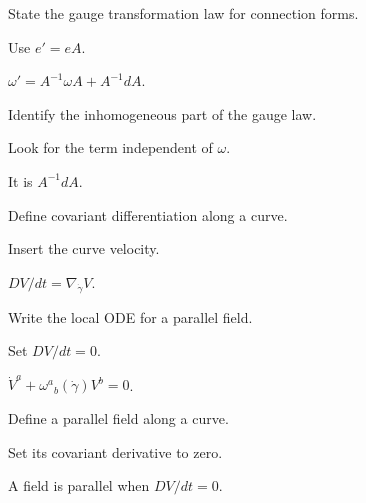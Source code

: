 \begin{exercise}\label{exr:vii21-09}
State the gauge transformation law for connection forms.
\end{exercise}
\begin{hint}
Use \(e'=eA\).
\end{hint}
\begin{solution}
\(\omega'=A^{-1}\omega A+A^{-1}dA\).
\end{solution}

\begin{exercise}\label{exr:vii21-10}
Identify the inhomogeneous part of the gauge law.
\end{exercise}
\begin{hint}
Look for the term independent of \(\omega\).
\end{hint}
\begin{solution}
It is \(A^{-1}dA\).
\end{solution}

\begin{exercise}\label{exr:vii21-11}
Define covariant differentiation along a curve.
\end{exercise}
\begin{hint}
Insert the curve velocity.
\end{hint}
\begin{solution}
\(DV/dt=\nabla_{\dot\gamma}V\).
\end{solution}

\begin{exercise}\label{exr:vii21-12}
Write the local ODE for a parallel field.
\end{exercise}
\begin{hint}
Set \(DV/dt=0\).
\end{hint}
\begin{solution}
\(\dot V^a+\omega^a{}_b(\dot\gamma)V^b=0\).
\end{solution}

\begin{exercise}\label{exr:vii21-13}
Define a parallel field along a curve.
\end{exercise}
\begin{hint}
Set its covariant derivative to zero.
\end{hint}
\begin{solution}
A field is parallel when \(DV/dt=0\).
\end{solution}

